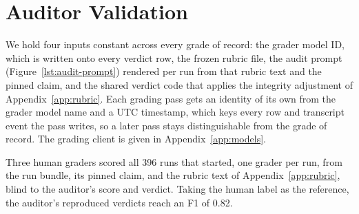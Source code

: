 \section{Auditor Validation}
\label{app:auditor-validation}

We hold four inputs constant across every grade of record: the grader model ID,
which is written onto every verdict row, the frozen rubric file, the audit prompt (Figure~\ref{lst:audit-prompt}) rendered per run from that rubric text and the
pinned claim, and the shared verdict code that applies the integrity adjustment
of Appendix~\ref{app:rubric}. Each grading pass gets an identity of its own from
the grader model name and a UTC timestamp, which keys every row and transcript
event the pass writes, so a later pass stays distinguishable from the grade of
record. The grading client is given in
Appendix~\ref{app:models}.

Three human graders scored all 396 runs that started, one grader per run, from
the run bundle, its pinned claim, and the rubric text of
Appendix~\ref{app:rubric}, blind to the auditor's score and verdict. Taking the
human label as the reference, the auditor's reproduced verdicts reach an F1 of
0.82.

